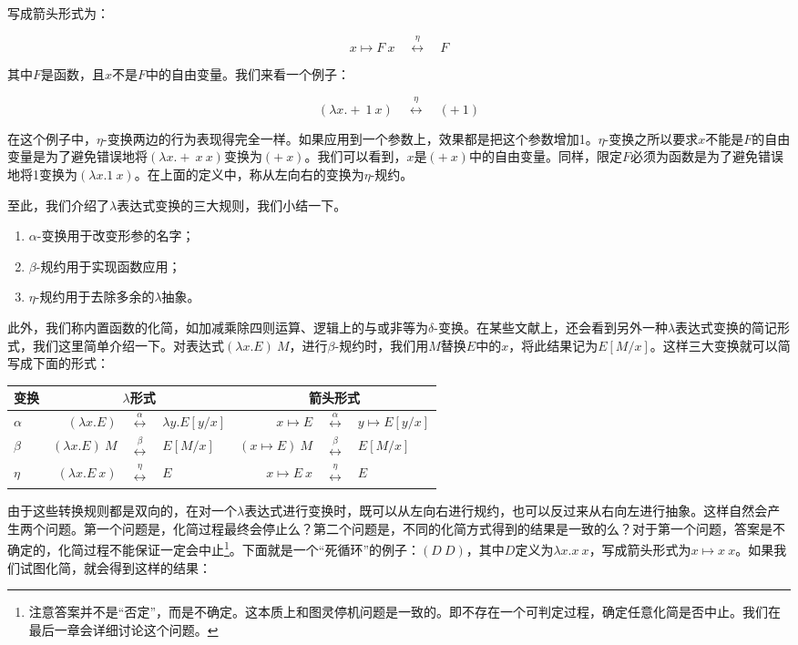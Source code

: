 \documentclass{article}
\begin{document}
写成箭头形式为：

\[
x \mapsto F\ x \quad \overset{\eta}{\longleftrightarrow} \quad F
\]

其中$F$是函数，且$x$不是$F$中的自由变量。我们来看一个例子：

\[
(\lambda x . +\ 1\ x) \quad \overset{\eta}{\longleftrightarrow} \quad (+\ 1)
\]

在这个例子中，$\eta$-变换两边的行为表现得完全一样。如果应用到一个参数上，效果都是把这个参数增加1。$\eta$-变换之所以要求$x$不能是$F$的自由变量是为了避免错误地将$(\lambda x. +\ x\ x)$变换为$(+\ x)$。我们可以看到，$x$是$(+\ x)$中的自由变量。同样，限定$F$必须为函数是为了避免错误地将1变换为$(\lambda x . 1\ x)$。在上面的定义中，称从左向右的变换为$\eta$-规约。

至此，我们介绍了$\lambda$表达式变换的三大规则，我们小结一下。

\begin{enumerate}
\item $\alpha$-变换用于改变形参的名字；
\item $\beta$-规约用于实现函数应用；
\item $\eta$-规约用于去除多余的$\lambda$抽象。
\end{enumerate}

此外，我们称内置函数的化简，如加减乘除四则运算、逻辑上的与或非等为$\delta$-变换。在某些文献上，还会看到另外一种$\lambda$表达式变换的简记形式，我们这里简单介绍一下。对表达式$(\lambda x. E)\ M$，进行$\beta$-规约时，我们用$M$替换$E$中的$x$，将此结果记为$E[M/x]$。这样三大变换就可以简写成下面的形式：

\begin{tabular}{|l|rcl|rcl|}
\hline
变换 & \multicolumn{3}{|c|}{$\lambda$形式} & \multicolumn{3}{|c|}{箭头形式} \\
\hline
$\alpha$ & $(\lambda x . E)$ & $\overset{\alpha}{\longleftrightarrow}$ & $\lambda y . E[y/x]$
         & $x \mapsto E$ & $\overset{\alpha}{\longleftrightarrow}$ & $y \mapsto E[y/x]$ \\
\hline
$\beta$  & $(\lambda x . E)\ M$ & $\overset{\beta}{\longleftrightarrow}$ & $E[M/x]$
         & $(x \mapsto E)\ M$ & $\overset{\beta}{\longleftrightarrow}$ & $E[M/x]$ \\
\hline
$\eta$   & $(\lambda x . E\ x)$ & $\overset{\eta}{\longleftrightarrow}$ & $E$
         & $x \mapsto E\ x$ & $\overset{\eta}{\longleftrightarrow}$ & $E$ \\
\hline
\end{tabular}

由于这些转换规则都是双向的，在对一个$\lambda$表达式进行变换时，既可以从左向右进行规约，也可以反过来从右向左进行抽象。这样自然会产生两个问题。第一个问题是，化简过程最终会停止么？第二个问题是，不同的化简方式得到的结果是一致的么？对于第一个问题，答案是不确定的，化简过程不能保证一定会中止\footnote{注意答案并不是“否定”，而是不确定。这本质上和图灵停机问题是一致的。即不存在一个可判定过程，确定任意化简是否中止。我们在最后一章会详细讨论这个问题。}。下面就是一个“死循环”的例子：$(D\ D)$，其中$D$定义为$\lambda x. x\ x$，写成箭头形式为$x \mapsto x\ x$。如果我们试图化简，就会得到这样的结果：
\end{document}
